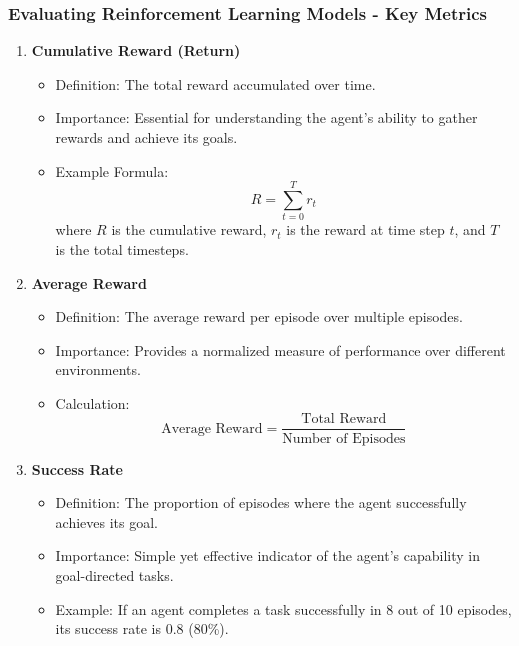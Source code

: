 \documentclass[aspectratio=169]{beamer}
\begin{document}
\begin{frame}[fragile]
    \frametitle{Evaluating Reinforcement Learning Models - Key Metrics}
    \begin{enumerate}
        \item \textbf{Cumulative Reward (Return)}
        \begin{itemize}
            \item Definition: The total reward accumulated over time.
            \item Importance: Essential for understanding the agent's ability to gather rewards and achieve its goals.
            \item Example Formula: 
            \[
            R = \sum_{t=0}^{T} r_t
            \]
            where \(R\) is the cumulative reward, \(r_t\) is the reward at time step \(t\), and \(T\) is the total timesteps.
        \end{itemize}
        
        \item \textbf{Average Reward}
        \begin{itemize}
            \item Definition: The average reward per episode over multiple episodes.
            \item Importance: Provides a normalized measure of performance over different environments.
            \item Calculation: 
            \[
            \text{Average Reward} = \frac{\text{Total Reward}}{\text{Number of Episodes}}
            \]
        \end{itemize}

        \item \textbf{Success Rate}
        \begin{itemize}
            \item Definition: The proportion of episodes where the agent successfully achieves its goal.
            \item Importance: Simple yet effective indicator of the agent's capability in goal-directed tasks.
            \item Example: If an agent completes a task successfully in 8 out of 10 episodes, its success rate is 0.8 (80\%).
        \end{itemize}
    \end{enumerate}
\end{frame}
\end{document}
